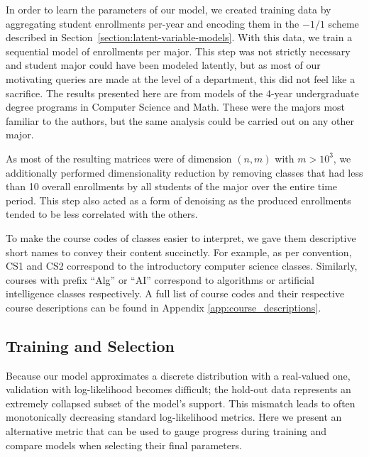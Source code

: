 \documentclass{edm_template}
\begin{document}
In order to learn the parameters of our model, we created training data by aggregating student enrollments per-year and encoding them in the $-1/1$ scheme described in Section~\ref{section:latent-variable-models}. With this data, we train a sequential model of enrollments per major. This step was not strictly necessary and student major could have been modeled latently, but as most of our motivating queries are made at the level of a department, this did not feel like a sacrifice. The results presented here are from models of the 4-year undergraduate degree programs in Computer Science and Math. These were the majors most familiar to the authors, but the same analysis could be carried out on any other major. 

As most of the resulting matrices were of dimension $(n,m)$ with $m > 10^3$, we additionally performed dimensionality reduction by removing classes that had less than 10 overall enrollments by all students of the major over the entire time period. This step also acted as a form of denoising as the produced enrollments tended to be less correlated with the others. 

To make the course codes of classes easier to interpret, we gave them descriptive short names to convey their content succinctly. For example, as per convention, CS1 and CS2 correspond to the introductory computer science classes. Similarly, courses with prefix ``Alg'' or ``AI'' correspond to algorithms or artificial intelligence classes respectively. A full list of course codes and their respective course descriptions can be found in Appendix \ref{app:course_descriptions}.

\subsection{Training and Selection}

Because our model approximates a discrete distribution with a real-valued one, validation with log-likelihood becomes difficult; the hold-out data represents an extremely collapsed subset of the model's support. This mismatch leads to often monotonically decreasing standard log-likelihood metrics. Here we present an alternative metric that can be used to gauge progress during training and compare models when selecting their final parameters. 
\end{document}
